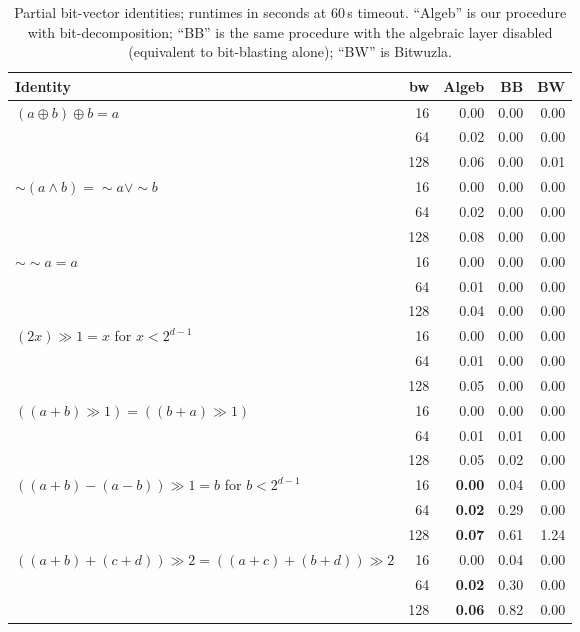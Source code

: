\documentclass[runningheads]{llncs}
\begin{document}
\begin{table}[ht]
\caption{Partial bit-vector identities; runtimes in seconds at
60\,s timeout. ``Algeb'' is our procedure with bit-decomposition;
``BB'' is the same procedure with the algebraic layer disabled
(equivalent to bit-blasting alone); ``BW'' is Bitwuzla.}
\label{tab:eval-pbv}
\centering
\begin{tabular}{lrrrr}
\toprule
Identity & bw & Algeb & BB & BW \\
\midrule
$(a \oplus b) \oplus b = a$ & 16 & 0.00 & 0.00 & 0.00 \\
                            & 64 & 0.02 & 0.00 & 0.00 \\
                            & 128 & 0.06 & 0.00 & 0.01 \\
$\sim(a \wedge b) = \sim a \vee \sim b$ & 16 & 0.00 & 0.00 & 0.00 \\
                            & 64 & 0.02 & 0.00 & 0.00 \\
                            & 128 & 0.08 & 0.00 & 0.00 \\
$\sim\sim a = a$            & 16 & 0.00 & 0.00 & 0.00 \\
                            & 64 & 0.01 & 0.00 & 0.00 \\
                            & 128 & 0.04 & 0.00 & 0.00 \\
$(2x)\!\gg\!1 = x$ for $x < 2^{d-1}$ & 16 & 0.00 & 0.00 & 0.00 \\
                            & 64 & 0.01 & 0.00 & 0.00 \\
                            & 128 & 0.05 & 0.00 & 0.00 \\
$((a{+}b)\!\gg\!1) = ((b{+}a)\!\gg\!1)$ & 16 & 0.00 & 0.00 & 0.00 \\
                            & 64 & 0.01 & 0.01 & 0.00 \\
                            & 128 & 0.05 & 0.02 & 0.00 \\
$((a{+}b){-}(a{-}b))\!\gg\!1 = b$ for $b < 2^{d-1}$ & 16 & \textbf{0.00} & 0.04 & 0.00 \\
                            & 64 & \textbf{0.02} & 0.29 & 0.00 \\
                            & 128 & \textbf{0.07} & 0.61 & 1.24 \\
$((a{+}b){+}(c{+}d))\!\gg\!2 = ((a{+}c){+}(b{+}d))\!\gg\!2$
                            & 16 & 0.00 & 0.04 & 0.00 \\
                            & 64 & \textbf{0.02} & 0.30 & 0.00 \\
                            & 128 & \textbf{0.06} & 0.82 & 0.00 \\
\bottomrule
\end{tabular}
\end{table}
\end{document}
